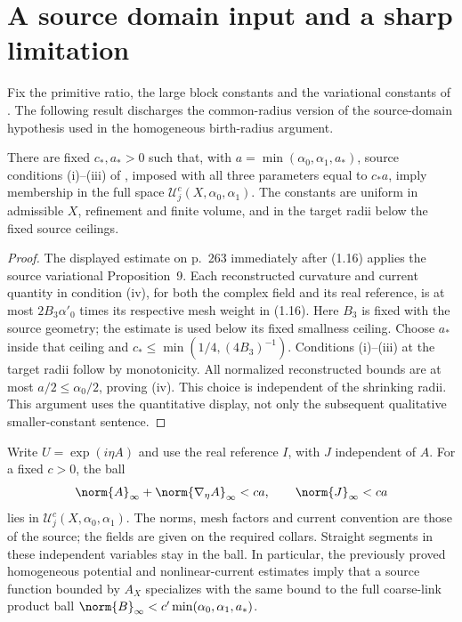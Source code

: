 \section{A source domain input and a sharp limitation}

Fix the primitive ratio, the large block constants and the variational
constants of \cite{B109}. The following result discharges the
common-radius version of the source-domain hypothesis used in the
homogeneous birth-radius argument.

\begin{proposition}
There are fixed $c_*,a_*>0$ such that, with
$a=\min(\alpha_0,\alpha_1,a_*)$, source conditions (i)--(iii) of
\cite[pp.~262--263, (1.10)--(1.16)]{B109}, imposed with all three
parameters equal to $c_*a$, imply membership in the full space
$\mathcal U_j^c(X,\alpha_0,\alpha_1)$.
The constants are uniform in admissible $X$, refinement and finite
volume, and in the target radii below the fixed source ceilings.
\end{proposition}

\begin{proof}
The displayed estimate on p.~263 immediately after (1.16) applies the
source variational Proposition~9. Each reconstructed curvature and
current quantity in condition (iv), for both the complex field and
its real reference, is at most $2B_3\alpha'_0$ times its respective
mesh weight in (1.16). Here $B_3$ is fixed with the source geometry;
the estimate is used below its fixed smallness ceiling. Choose $a_*$
inside that ceiling and
$c_*\leq\min(1/4,(4B_3)^{-1})$. Conditions (i)--(iii) at the target
radii follow by monotonicity. All normalized reconstructed bounds
are at most $a/2\leq\alpha_0/2$, proving (iv). This choice is independent
of the shrinking radii. This argument uses the quantitative display,
not only the subsequent qualitative smaller-constant sentence.
\end{proof}

\begin{corollary}
Write $U=\exp(i\eta A)$ and use the real reference $I$, with $J$
independent of $A$. For a fixed $c>0$, the ball
\[
 \norm{A}_{\infty}+\norm{\nabla_\eta A}_{\infty}<ca,
 \qquad \norm{J}_{\infty}<ca
\]
lies in $\mathcal U_j^c(X,\alpha_0,\alpha_1)$. The norms, mesh factors
and current convention are those of the source; the fields are given
on the required collars. Straight segments in these independent
variables stay in the ball. In particular, the previously proved
homogeneous potential and nonlinear-current estimates imply that a
source function bounded by $A_X$ specializes with the same bound to
the full coarse-link product ball
$\norm{B}_\infty<c'\min(\alpha_0,\alpha_1,a_*)$.
\end{corollary}

